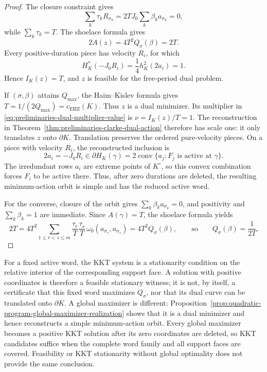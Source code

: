 \begin{proof}
The closure constraint gives
\[
  \sum_k\tau_kR_{\sigma_k}
  =2T J_0\sum_k\beta_k a_{\sigma_k}
  =0,
\]
while \(\sum_k\tau_k=T\).  The shoelace formula gives
\[
  2A(z)
  =4T^2Q_\sigma(\beta)
  =2T.
\]
Every positive-duration piece has velocity \(R_i\), for which
\[
  H_K^*(-J_0R_i)=\frac14h_K^2(2a_i)=1.
\]
Hence \(I_K(z)=T\), and \(z\) is feasible for the free-period dual problem.

If \((\sigma,\beta)\) attains \(Q_{\max}\), the Haim--Kislev formula gives
\(T=1/(2Q_{\max})=c_{\mathrm{EHZ}}(K)\).  Thus \(z\) is a dual minimizer.
Its multiplier in \eqref{eq:preliminaries-dual-multiplier-value} is
\(\nu=I_K(z)/T=1\).  The reconstruction in
Theorem~\ref{thm:preliminaries-clarke-dual-action} therefore has scale one:
it only translates \(z\) onto \(\partial K\).  Translation preserves the
ordered pure-velocity pieces. On a piece with velocity \(R_i\), the
reconstructed inclusion is
\[
  2a_i=-J_0R_i\in\partial H_K(\gamma)
  =2\operatorname{conv}\{a_j:F_j\text{ is active at }\gamma\}.
\]
The irredundant rows \(a_i\) are extreme points of \(K^\circ\), so this convex
combination forces \(F_i\) to be active there. Thus, after zero durations are
deleted, the resulting minimum-action orbit is simple and has the reduced
active word.

For the converse, closure of the orbit gives
\(\sum_k\beta_k a_{\sigma_k}=0\), and positivity and
\(\sum_k\beta_k=1\) are immediate.  Since \(A(\gamma)=T\), the shoelace
formula yields
\[
  2T
  =
  4T^2
  \sum_{1\leq r<s\leq m}
    \frac{\tau_r}{T}\frac{\tau_s}{T}\,
    \omega_0(a_{\sigma_r},a_{\sigma_s})
  =
  4T^2Q_\sigma(\beta),
  \qquad\text{so}\qquad
  Q_\sigma(\beta)=\frac{1}{2T}.
\]
\end{proof}

For a fixed active word, the KKT system is a stationarity condition on the
relative interior of the corresponding support face.  A solution with
positive coordinates is therefore a feasible stationary witness; it is
not, by itself, a certificate that this fixed word maximizes \(Q_\sigma\), nor
that its dual curve can be translated onto \(\partial K\).  A global maximizer
is different: Proposition~\ref{prop:quadratic-program-global-maximizer-realization}
shows that it is a dual minimizer and hence reconstructs a simple
minimum-action orbit.  Every global maximizer becomes a positive KKT solution
after its zero coordinates are deleted, so KKT candidates suffice when
the complete word family and all support faces are covered.  Feasibility or
KKT stationarity without global optimality does not provide the same
conclusion.

